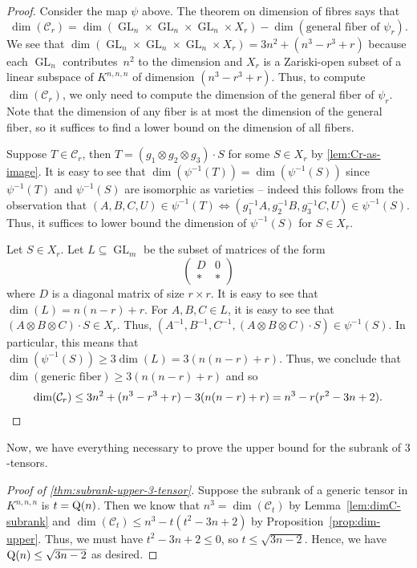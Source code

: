 \documentclass[10pt,a4paper]{article}
\theoremstyle{definition}
\theoremstyle{remark}
\newcommand{\gensubrank}{{\rm Q}}
\newcommand{\GL}{\operatorname{GL}}
\begin{document}
\begin{proof} 
Consider the map $\psi$ above. The theorem on dimension of fibres says that 
$$
\dim(\mathcal{C}_r) = \dim(\GL_n \times \GL_n \times \GL_n \times X_r) - \dim(\text{general fiber of } \psi_r).
$$
We see that $\dim(\GL_n \times \GL_n \times \GL_n \times X_r) = 3n^2 + (n^3-r^3 + r)$ because each $\GL_n$ contributes~$n^2$ to the dimension and $X_r$ is a Zariski-open subset of a linear subspace of $K^{n,n,n}$ of dimension $(n^3-r^3 + r)$. Thus, to compute $\dim(\mathcal{C}_r)$, we only need to compute the dimension of the general fiber of $\psi_r$. Note that the dimension of any fiber is at most the dimension of the general fiber, so it suffices to find a lower bound on the dimension of all fibers.

Suppose $T \in \mathcal{C}_r$, then $T = (g_1 \otimes g_2 \otimes g_3) \cdot S$ for some $S \in X_r$ by \autoref{lem:Cr-as-image}. It is easy to see that $\dim(\psi^{-1}(T)) = \dim(\psi^{-1}(S))$ since $\psi^{-1}(T)$ and $\psi^{-1}(S)$ are isomorphic as varieties -- indeed this follows from the observation that $(A,B,C,U) \in \psi^{-1}(T) \Longleftrightarrow (g_1^{-1}A, g_2^{-1}B, g_3^{-1}C, U) \in \psi^{-1}(S)$. Thus, it suffices to lower bound the dimension of $\psi^{-1}(S)$ for $S \in X_r$.

Let $S \in X_r$.
Let $L \subseteq \GL_m$ be the subset of matrices of the form 
\[
\begin{pmatrix} D & 0 \\ \ast & \ast \end{pmatrix}
\]
where $D$ is a diagonal matrix of size $r \times r$. It is easy to see that $\dim(L) = n(n-r) + r$. For $A,B,C \in L$, it is easy to see that $(A \otimes B \otimes C) \cdot S \in X_r$. Thus, $(A^{-1}, B^{-1}, C^{-1}, (A \otimes B \otimes C) \cdot S) \in \psi^{-1}(S)$. In particular, this means that $\dim(\psi^{-1}(S)) \geq 3 \dim(L) = 3(n(n-r) + r)$. Thus, we conclude that $\dim(\text{generic fiber}) \geq 3(n(n-r) + r)$ and so
\[
\dim(\mathcal{C}_r) \leq 3n^2 + (n^3-r^3 + r) - 3(n(n-r) + r) = n^3 - r(r^2-3n+2).\qedhere
\]

\end{proof}

Now, we have everything necessary to prove the upper bound for the subrank of $3$-tensors.
\begin{proof} [Proof of \autoref{thm:subrank-upper-3-tensor}]
Suppose the subrank of a generic tensor in $K^{n,n,n}$ is $t = \gensubrank(n)$. Then we know that $n^3 = \dim(\mathcal{C}_t)$ by Lemma~\ref{lem:dimC-subrank} and $\dim(\mathcal{C}_t) \leq n^3 - t(t^2 - 3n+2)$ by  Proposition~\ref{prop:dim-upper}. Thus, we must have $t^2 - 3n + 2 \leq 0$, so $t \leq \sqrt{3n-2}$. Hence, we have $\gensubrank(n) \leq \sqrt{3n-2}$ as desired. 
\end{proof}
\end{document}
